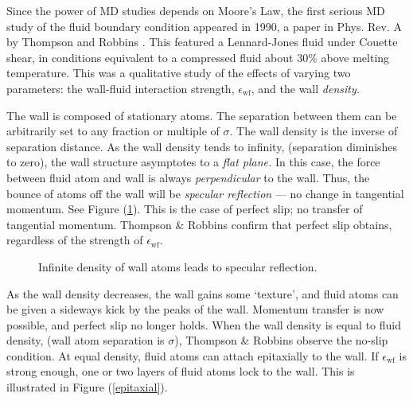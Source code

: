 \documentclass[12pt, a4paper, twoside, openright]{book}
\newcommand{\ewf}{\ensuremath{\epsilon_{\mathrm{wf}}}}
\begin{document}
\vspace*{1em}
Since the power of MD studies depends on Moore's Law, the first serious MD study of the fluid boundary condition appeared in 1990, a paper in Phys. Rev. A by Thompson and Robbins \cite{ThompsonRobbins1990}.
This featured a Lennard-Jones fluid under Couette shear, in conditions equivalent to a compressed fluid about 30\% above melting temperature. This was a qualitative study of the effects of varying two parameters: the wall-fluid interaction strength, \ewf, and the wall \emph{density.}

The wall is composed of stationary atoms. The separation between them can be arbitrarily set to any fraction or multiple of $\sigma$. The wall density is the inverse of separation distance. As the wall density tends to infinity, (separation diminishes to zero), the wall structure asymptotes to a \emph{flat plane.} In this case, the force between fluid atom and wall is always \emph{perpendicular} to the wall. Thus, the bounce of atoms off the wall will be \emph{specular reflection} --- no change in tangential momentum.  See Figure (\ref{specular}). This is the case of perfect slip; no transfer of tangential momentum. Thompson \& Robbins confirm that perfect slip obtains, regardless of the strength of \ewf.


\begin{figure}[ht]
\centering
{}
\caption{Infinite density of wall atoms leads to specular reflection.} \label{specular}
\end{figure}

\clearpage
As the wall density decreases, the wall gains some `texture', and fluid atoms can be given a sideways kick by the peaks of the wall.  Momentum transfer is now possible, and perfect slip no longer holds.
When the wall density is equal to fluid density, (wall atom separation is $\sigma$), Thompson \& Robbins observe the no-slip condition. At equal density, fluid atoms can attach epitaxially to the wall.  If $\ewf$ is strong enough, one or two layers of fluid atoms lock to the wall.  This is illustrated in Figure (\ref{epitaxial}).
\end{document}
